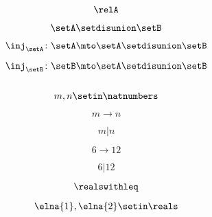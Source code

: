 \begin{forslides}
    \begin{equation}
        \label{eq:combination-120}
        \relA
    \end{equation}

    \begin{equation}
        \label{eq:combination-121}
        \setA \setdisunion \setB
    \end{equation}

    \begin{equation}
        \label{eq:combination-122}
        \inj_\setA\colon \setA\mto \setA \setdisunion\setB
    \end{equation}

    \begin{equation}
        \label{eq:combination-123}
        \inj_\setB\colon \setB\mto \setA \setdisunion\setB
    \end{equation}

    \begin{equation}
        \label{eq:combination-124}
    \end{equation}

    \begin{equation}
        \label{eq:combination-125}
        m,n\setin \natnumbers
    \end{equation}

    \begin{equation}
        \label{eq:combination-126}
        m\to n
    \end{equation}

    \begin{equation}
        \label{eq:combination-127}
        m | n
    \end{equation}

    \begin{equation}
        \label{eq:combination-128}
        6\to 12
    \end{equation}

    \begin{equation}
        \label{eq:combination-129}
        6 | 12
    \end{equation}

    \begin{equation}
        \label{eq:combination-130}
        \realswithleq
    \end{equation}

    \begin{equation}
        \label{eq:combination-131}
        \elna{1},\elna{2}\setin \reals
    \end{equation}


\end{forslides}
